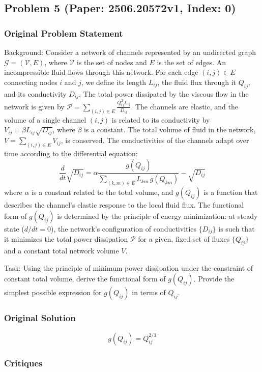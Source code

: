\documentclass[10pt]{article}
\begin{document}
\newpage
\subsection*{Problem 5 (Paper: 2506.20572v1, Index: 0)}

\subsubsection*{Original Problem Statement}
Background:
Consider a network of channels represented by an undirected graph $\mathcal{G} = (\mathcal{V}, E)$, where $\mathcal{V}$ is the set of nodes and $E$ is the set of edges. An incompressible fluid flows through this network. For each edge $(i,j) \in E$ connecting nodes $i$ and $j$, we define its length $L_{ij}$, the fluid flux through it $Q_{ij}$, and its conductivity $D_{ij}$. The total power dissipated by the viscous flow in the network is given by $\mathcal{P} = \sum_{(i,j)\in E} \frac{Q_{ij}^2 L_{ij}}{D_{ij}}$. The channels are elastic, and the volume of a single channel $(i,j)$ is related to its conductivity by $V_{ij} = \beta L_{ij} \sqrt{D_{ij}}$, where $\beta$ is a constant. The total volume of fluid in the network, $V = \sum_{(i,j)\in E} V_{ij}$, is conserved. The conductivities of the channels adapt over time according to the differential equation:
$$
\frac{d}{dt}\sqrt{D_{ij}} = \alpha \frac{g(Q_{ij})}{\sum_{(k,m)\in E} L_{km}\, g(Q_{km})} - \sqrt{D_{ij}}
$$
where $\alpha$ is a constant related to the total volume, and $g(Q_{ij})$ is a function that describes the channel's elastic response to the local fluid flux. The functional form of $g(Q_{ij})$ is determined by the principle of energy minimization: at steady state ($d/dt = 0$), the network's configuration of conductivities $\{D_{ij}\}$ is such that it minimizes the total power dissipation $\mathcal{P}$ for a given, fixed set of fluxes $\{Q_{ij}\}$ and a constant total network volume $V$.

Task:
Using the principle of minimum power dissipation under the constraint of constant total volume, derive the functional form of $g(Q_{ij})$. Provide the simplest possible expression for $g(Q_{ij})$ in terms of $Q_{ij}$.

\subsubsection*{Original Solution}
\[ g(Q_{ij}) = Q_{ij}^{2/3} \]

\subsubsection*{Critiques}
\end{document}
